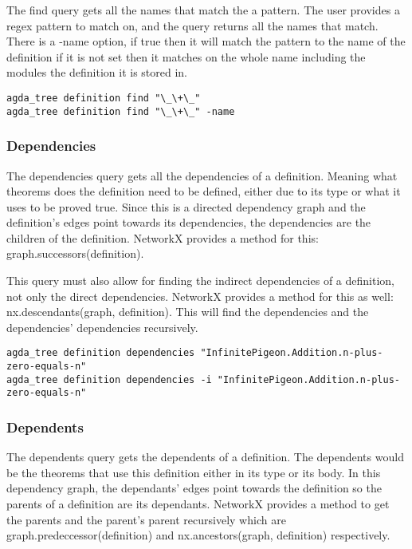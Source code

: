 The find query gets all the names that match the a pattern. The user provides a
regex pattern to match on, and the query returns all the names that match.
There is a -name option, if true then it will match the pattern to the name of
the definition if it is not set then it matches on the whole name including the
modules the definition it is stored in.

\begin{lstlisting}
agda_tree definition find "\_\+\_"
agda_tree definition find "\_\+\_" -name
\end{lstlisting}

\subsubsection{Dependencies}

The dependencies query gets all the dependencies of a definition. Meaning what
theorems does the definition need to be defined, either due to its type or what
it uses to be proved true. Since this is a directed dependency graph and the
definition's edges point towards its dependencies, the dependencies are the
children of the definition. NetworkX provides a method for this:
\textsf{graph.successors(definition)}.

This query must also allow for finding the indirect dependencies of a
definition, not only the direct dependencies. NetworkX provides a method for
this as well: \textsf{nx.descendants(graph, definition)}. This will find the
dependencies and the dependencies' dependencies recursively.

\begin{lstlisting}
agda_tree definition dependencies "InfinitePigeon.Addition.n-plus-zero-equals-n"
agda_tree definition dependencies -i "InfinitePigeon.Addition.n-plus-zero-equals-n"
\end{lstlisting}

\subsubsection{Dependents}

The dependents query gets the dependents of a definition. The dependents would
be the theorems that use this definition either in its type or its body. In
this dependency graph, the dependants' edges point towards the definition so
the parents of a definition are its dependants. NetworkX provides a method to
get the parents and the parent's parent recursively which are
\textsf{graph.predeccessor(definition)} and \textsf{nx.ancestors(graph,
definition)} respectively.


